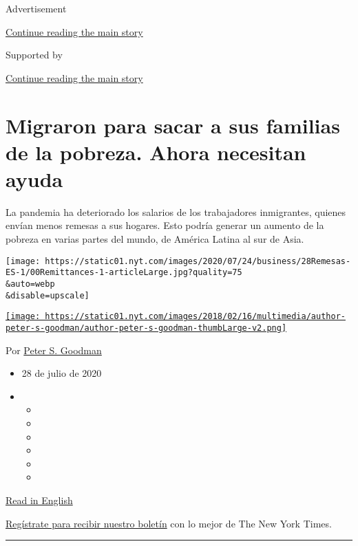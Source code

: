 Advertisement

\protect\hyperlink{after-top}{Continue reading the main story}

Supported by

\protect\hyperlink{after-sponsor}{Continue reading the main story}

\hypertarget{migraron-para-sacar-a-sus-familias-de-la-pobreza-ahora-necesitan-ayuda}{%
\section{Migraron para sacar a sus familias de la pobreza. Ahora
necesitan
ayuda}\label{migraron-para-sacar-a-sus-familias-de-la-pobreza-ahora-necesitan-ayuda}}

La pandemia ha deteriorado los salarios de los trabajadores inmigrantes,
quienes envían menos remesas a sus hogares. Esto podría generar un
aumento de la pobreza en varias partes del mundo, de América Latina al
sur de Asia.

\texttt{[image: https://static01.nyt.com/images/2020/07/24/business/28Remesas-ES-1/00Remittances-1-articleLarge.jpg?quality=75\\\&auto=webp\\\&disable=upscale]}

\href{https://www.nytimes.com/by/peter-s-goodman}{\texttt{[image: https://static01.nyt.com/images/2018/02/16/multimedia/author-peter-s-goodman/author-peter-s-goodman-thumbLarge-v2.png]}}

Por \href{https://www.nytimes.com/by/peter-s-goodman}{Peter S. Goodman}

\begin{itemize}
\item
  28 de julio de 2020
\item
  \begin{itemize}
  \item
  \item
  \item
  \item
  \item
  \item
  \end{itemize}
\end{itemize}

\href{https://www.nytimes.com/2020/07/27/business/global-remittances-coronavirus.html}{Read
in English}

\href{https://www.nytimes.com/newsletters/el-times}{Regístrate para
recibir nuestro boletín} con lo mejor de The New York Times.

\begin{center}\rule{0.5\linewidth}{\linethickness}\end{center}

